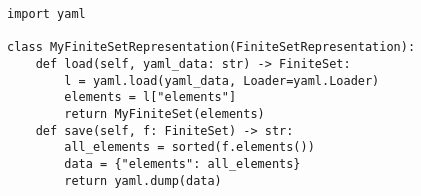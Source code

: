 \begin{minipage}{456pt}
\begin{verbatim}
import yaml

class MyFiniteSetRepresentation(FiniteSetRepresentation):
    def load(self, yaml_data: str) -> FiniteSet:
        l = yaml.load(yaml_data, Loader=yaml.Loader)
        elements = l["elements"]
        return MyFiniteSet(elements)
    def save(self, f: FiniteSet) -> str:
        all_elements = sorted(f.elements())
        data = {"elements": all_elements}
        return yaml.dump(data)
\end{verbatim}
\end{minipage}